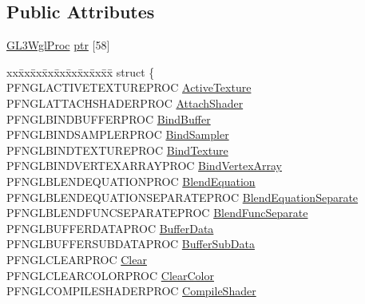 \subsection*{Public Attributes}
\begin{DoxyCompactItemize}
\item 
\hyperlink{imgui__impl__opengl3__loader_8h_ab3b2dd5b9cba7f31de0317722d9375b7}{G\+L3\+Wgl\+Proc} \hyperlink{unionGL3WProcs_a08020d1bd79649b8746cd577ba342884}{ptr} \mbox{[}58\mbox{]}
\item 
\begin{tabbing}
xx\=xx\=xx\=xx\=xx\=xx\=xx\=xx\=xx\=\kill
struct \{\\
\>PFNGLACTIVETEXTUREPROC \hyperlink{unionGL3WProcs_a1fa26081b7b2b7f69470fb759374ee42}{ActiveTexture}\\
\>PFNGLATTACHSHADERPROC \hyperlink{unionGL3WProcs_a6cb4161d70caada26c0ecc3cc427aab7}{AttachShader}\\
\>PFNGLBINDBUFFERPROC \hyperlink{unionGL3WProcs_a863653112afda615b3f1797a21170328}{BindBuffer}\\
\>PFNGLBINDSAMPLERPROC \hyperlink{unionGL3WProcs_a75e6db55398ff3af23b763211788d9c3}{BindSampler}\\
\>PFNGLBINDTEXTUREPROC \hyperlink{unionGL3WProcs_a0ce3dabb1cf42c163b64fd5f290703fe}{BindTexture}\\
\>PFNGLBINDVERTEXARRAYPROC \hyperlink{unionGL3WProcs_a92f4e3f7b7a3660d2d117acd9db0d381}{BindVertexArray}\\
\>PFNGLBLENDEQUATIONPROC \hyperlink{unionGL3WProcs_af64b4960c88e27cfb061fa321866dffd}{BlendEquation}\\
\>PFNGLBLENDEQUATIONSEPARATEPROC \hyperlink{unionGL3WProcs_ab39a5b164adc89fc93b02dfbf9acef51}{BlendEquationSeparate}\\
\>PFNGLBLENDFUNCSEPARATEPROC \hyperlink{unionGL3WProcs_ad305d2caa76d011e5a61ebc9f1079f4a}{BlendFuncSeparate}\\
\>PFNGLBUFFERDATAPROC \hyperlink{unionGL3WProcs_af8a0c601b0c22b35f8a23e37a753422e}{BufferData}\\
\>PFNGLBUFFERSUBDATAPROC \hyperlink{unionGL3WProcs_a5a380ca42ed64d2754decf8ee17642f8}{BufferSubData}\\
\>PFNGLCLEARPROC \hyperlink{unionGL3WProcs_a327a3c6d29c7786ebd84832ffa034f92}{Clear}\\
\>PFNGLCLEARCOLORPROC \hyperlink{unionGL3WProcs_a46f838d2b1fb9d492c841e1a5a454b8a}{ClearColor}\\
\>PFNGLCOMPILESHADERPROC \hyperlink{unionGL3WProcs_a9add6a0518701c95fe76a4c543433748}{CompileShader}\\

\end{tabbing}
\end{DoxyCompactItemize}
